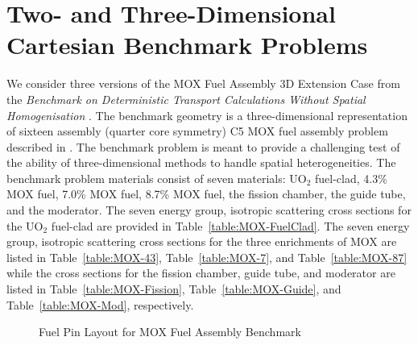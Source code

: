 \clearpage

\section{Two- and Three-Dimensional Cartesian Benchmark Problems}

We consider three versions of the MOX Fuel Assembly 3D Extension Case from the \textit{Benchmark on Deterministic Transport Calculations Without Spatial Homogenisation} \cite{lewis2001benchmark}. The benchmark geometry is a three-dimensional representation of sixteen assembly (quarter core symmetry) C5 MOX fuel assembly problem described in \cite{cavarec1994oecd}. The benchmark problem is meant to provide a challenging test of the ability of three-dimensional methods to handle spatial heterogeneities. The benchmark problem materials consist of seven materials: UO$_{2}$ fuel-clad, 4.3\% MOX fuel, 7.0\% MOX fuel, 8.7\% MOX fuel, the fission chamber, the guide tube, and the moderator. The seven energy group, isotropic scattering cross sections for the UO$_{2}$ fuel-clad are provided in Table~\ref{table:MOX-FuelClad}. The seven energy group, isotropic scattering cross sections for the three enrichments of MOX are listed in Table~\ref{table:MOX-43}, Table~\ref{table:MOX-7}, and Table~\ref{table:MOX-87} while the cross sections for the fission chamber, guide tube, and moderator are listed in Table~\ref{table:MOX-Fission}, Table~\ref{table:MOX-Guide}, and Table~\ref{table:MOX-Mod}, respectively.

\begin{figure}[!htbp]
\centering
\resizebox{0.55\textwidth}{!}{
	
	}
	\caption{Fuel Pin Layout for MOX Fuel Assembly Benchmark}
	\label{fig:Fuel}
\end{figure}

